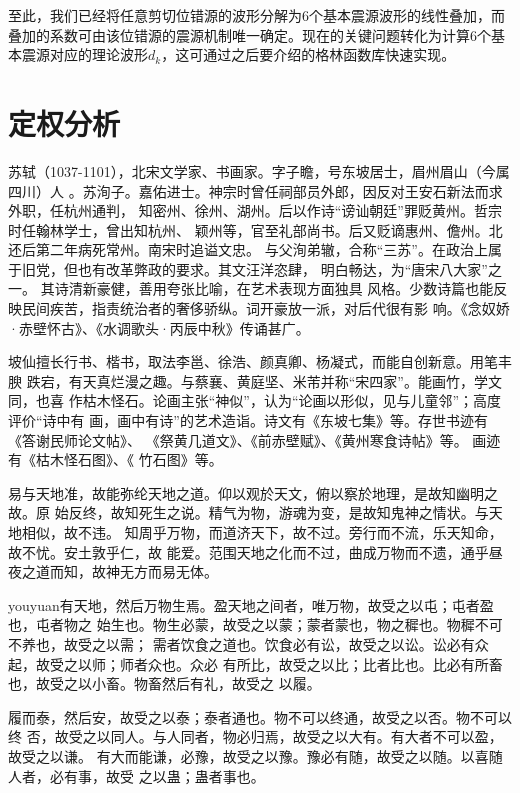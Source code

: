 至此，我们已经将任意剪切位错源的波形分解为6个基本震源波形的线性叠加，而叠加的系数可由该位错源的震源机制唯一确定。现在的关键问题转化为计算6个基本震源对应的理论波形$d_k$，这可通过之后要介绍的格林函数库快速实现。


\section{定权分析}
\label{sec:first}

苏轼（1037-1101），北宋文学家、书画家。字子瞻，号东坡居士，眉州眉山（今属四川）人
。苏洵子。嘉佑进士。神宗时曾任祠部员外郎，因反对王安石新法而求外职，任杭州通判，
知密州、徐州、湖州。后以作诗“谤讪朝廷”罪贬黄州。哲宗时任翰林学士，曾出知杭州、
颖州等，官至礼部尚书。后又贬谪惠州、儋州。北还后第二年病死常州。南宋时追谥文忠。
与父洵弟辙，合称“三苏”。在政治上属于旧党，但也有改革弊政的要求。其文汪洋恣肆，
明白畅达，为“唐宋八大家”之一。  其诗清新豪健，善用夸张比喻，在艺术表现方面独具
风格。少数诗篇也能反映民间疾苦，指责统治者的奢侈骄纵。词开豪放一派，对后代很有影
响。《念奴娇·赤壁怀古》、《水调歌头·丙辰中秋》传诵甚广。

{\kaishu 坡仙擅长行书、楷书，取法李邕、徐浩、颜真卿、杨凝式，而能自创新意。用笔丰腴
  跌宕，有天真烂漫之趣。与蔡襄、黄庭坚、米芾并称“宋四家”。能画竹，学文同，也喜
  作枯木怪石。论画主张“神似”，认为“论画以形似，见与儿童邻”；高度评价“诗中有
  画，画中有诗”的艺术造诣。诗文有《东坡七集》等。存世书迹有《答谢民师论文帖》、
  《祭黄几道文》、《前赤壁赋》、《黄州寒食诗帖》等。  画迹有《枯木怪石图》、《
  竹石图》等。}

{\fangsong 易与天地准，故能弥纶天地之道。仰以观於天文，俯以察於地理，是故知幽明之故。原
  始反终，故知死生之说。精气为物，游魂为变，是故知鬼神之情状。与天地相似，故不违。
  知周乎万物，而道济天下，故不过。旁行而不流，乐天知命，故不忧。安土敦乎仁，故
  能爱。范围天地之化而不过，曲成万物而不遗，通乎昼夜之道而知，故神无方而易无体。}

{\ifcsname youyuan\endcsname\youyuan 有天地，然后万物生焉。盈天地之间者，唯万物，故受之以屯；屯者盈也，屯者物之
  始生也。物生必蒙，故受之以蒙；蒙者蒙也，物之穉也。物穉不可不养也，故受之以需；
  需者饮食之道也。饮食必有讼，故受之以讼。讼必有众起，故受之以师；师者众也。众必
  有所比，故受之以比；比者比也。比必有所畜也，故受之以小畜。物畜然后有礼，故受之
  以履。\fi}

{\heiti 履而泰，然后安，故受之以泰；泰者通也。物不可以终通，故受之以否。物不可以终
  否，故受之以同人。与人同者，物必归焉，故受之以大有。有大者不可以盈，故受之以谦。
  有大而能谦，必豫，故受之以豫。豫必有随，故受之以随。以喜随人者，必有事，故受
  之以蛊；蛊者事也。}

